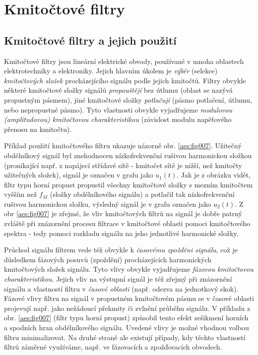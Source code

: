 \setchaptertoc
\chapter{Kmitočtové filtry}


  \section{Kmitočtové filtry a jejich použití}
    Kmitočtové filtry jsou lineární elektrické obvody, používané v mnoha oblastech elektrotechniky a
    elektroniky. Jejich hlavním úkolem je \emph{výběr} (selekce) \emph{kmitočtových složek}
    procházejícího signálu podle jejich kmitočtů. Filtry obvykle některé kmitočtové složky signálů
    \emph{propouštějí} bez útlumu (oblast se nazývá propustným pásmem), jiné kmitočtové složky
    \emph{potlačují} (pásmo potlačení, útlumu, nebo nepropustné pásmo). Tyto vlastnosti obvykle
    vyjadřujeme \emph{modulovou (amplitudovou) kmitočtovou charakteristikou} (závislost modulu
    napěťového přenosu na kmitočtu).

    Příklad použití kmitočtového filtru ukazuje názorně obr. \ref{aes:fig007}. Užitečný obdélníkový
    signál byl znehodnocen níz\-ko\-frek\-ven\-ční rušivou harmonickou složkou (pronikající např. z
    napájecí střídavé sítě - kmitočet sítě je nižší, než kmitočty užitečných složek), signál je
    označen v grafu jako \(u_1(t)\). Jak je z obrázku vidět, filtr typu horní propust propustil
    všechny kmitočtové složky s mezním kmitočtem vyšším než \(f_M\) (složky obdélníkového signálu) a
    potlačil tak nízkofrekvenční rušivou harmonickou složku, výsledný signál je v grafu označen jako
    \(u_2(t)\). Z obr \ref{aes:fig007} je zřejmé, že vliv kmitočtových filtrů na signál je dobře
    patrný zvláště při znázornění procesu filtrace v kmitočtové oblasti pomoci kmitočtového spektra
    - tedy pomoci rozkladu signálu na jeho jednotlivé harmonické složky.

    Průchod signálu filtrem vede též obvykle k \emph{časovému zpožděni signálu}, což je důsledkem
    fázových posuvů (zpoždění) procházejících harmonických kmitočtových složek signálu. Ty\-to vlivy
    obvykle vyjadřujeme \emph{fázovou kmitočtovou charakteristikou}. Jejich vliv na výstupní signál
    je též zřejmý při znázornění signálu a vlastností filtru v \emph{časové oblasti} (např. odezva
    na jednotkový skok). Fázové vlivy filtru na signál v propustném kmitočtovém pásmu se v časové
    oblasti projevují např. jako nežádoucí překmity či zvlnění průběhu signálu. V příkladu z obr.
    \ref{aes:fig007} (filtr typu horní propust) způsobil tento efekt zešikmení horních a spodních
    hran obdélníkového signálu. Uvedené vlivy je možné vhodnou volbou filtru minimalizovat. Na druhé
    straně ale existují případy, kdy těchto vlastností filtrů záměrné využíváme, např. ve fázovacích
    a zpožďovacích obvodech.

